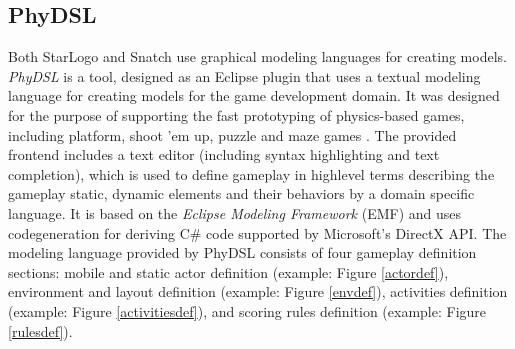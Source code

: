 \documentclass[runningheads,a4paper]{llncs}
\begin{document}
  
  \subsection{PhyDSL}
  Both StarLogo and Snatch use graphical modeling languages for creating models. 
  \emph{PhyDSL} is a tool, designed as an Eclipse\cite{eclipse} plugin that uses a textual modeling language for creating models for the game development domain.
  It was designed for the purpose of supporting the fast prototyping of physics-based games, including platform, shoot ’em up, 
  puzzle and maze games \cite{guana2014phydsl}. 
  The provided frontend includes a text editor (including syntax highlighting and text completion), which is used to define gameplay in highlevel
  terms describing the gameplay static, dynamic elements and their behaviors by a domain specific language.  
  It is based on the \emph{Eclipse Modeling Framework}\cite{} (EMF) and uses codegeneration for deriving C\# code supported by Microsoft’s
  DirectX API. 
  The modeling language provided by PhyDSL consists of four gameplay definition sections: mobile and
  static actor definition (example: Figure \ref{actordef}), 
  environment and layout definition (example: Figure \ref{envdef}), 
  activities definition (example: Figure  \ref{activitiesdef}), 
  and scoring rules definition (example: Figure \ref{rulesdef}).
  
\end{document}
